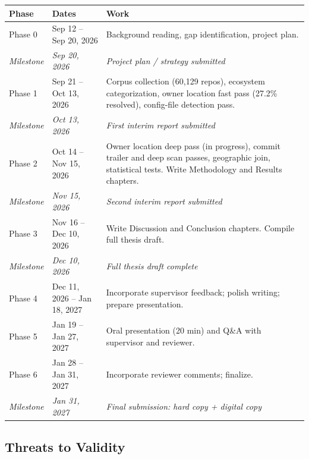 \documentclass[11pt,a4paper]{article}
\begin{document}
\begin{center}
\begin{tabularx}{\textwidth}{@{}l l X@{}}
\toprule
\textbf{Phase} & \textbf{Dates} & \textbf{Work} \\
\midrule
Phase 0 & Sep 12 -- Sep 20, 2026 &
    Background reading, gap identification, project plan. \\
\addlinespace
\textit{Milestone} & \textit{Sep 20, 2026} & \textit{Project plan / strategy submitted} \\
\addlinespace
Phase 1 & Sep 21 -- Oct 13, 2026 &
    Corpus collection (60,129 repos), ecosystem categorization, owner location
    fast pass (27.2\% resolved), config-file detection pass. \\
\addlinespace
\textit{Milestone} & \textit{Oct 13, 2026} & \textit{First interim report submitted} \\
\addlinespace
Phase 2 & Oct 14 -- Nov 15, 2026 &
    Owner location deep pass (in progress), commit trailer and deep scan passes,
    geographic join, statistical tests. Write Methodology and Results chapters. \\
\addlinespace
\textit{Milestone} & \textit{Nov 15, 2026} & \textit{Second interim report submitted} \\
\addlinespace
Phase 3 & Nov 16 -- Dec 10, 2026 &
    Write Discussion and Conclusion chapters. Compile full thesis draft. \\
\addlinespace
\textit{Milestone} & \textit{Dec 10, 2026} & \textit{Full thesis draft complete} \\
\addlinespace
Phase 4 & Dec 11, 2026 -- Jan 18, 2027 &
    Incorporate supervisor feedback; polish writing; prepare presentation. \\
\addlinespace
Phase 5 & Jan 19 -- Jan 27, 2027 &
    Oral presentation (20 min) and Q\&A with supervisor and reviewer. \\
\addlinespace
Phase 6 & Jan 28 -- Jan 31, 2027 &
    Incorporate reviewer comments; finalize. \\
\addlinespace
\textit{Milestone} & \textit{Jan 31, 2027} & \textit{Final submission: hard copy + digital copy} \\
\bottomrule
\end{tabularx}
\end{center}

\subsection{Threats to Validity}
\end{document}
